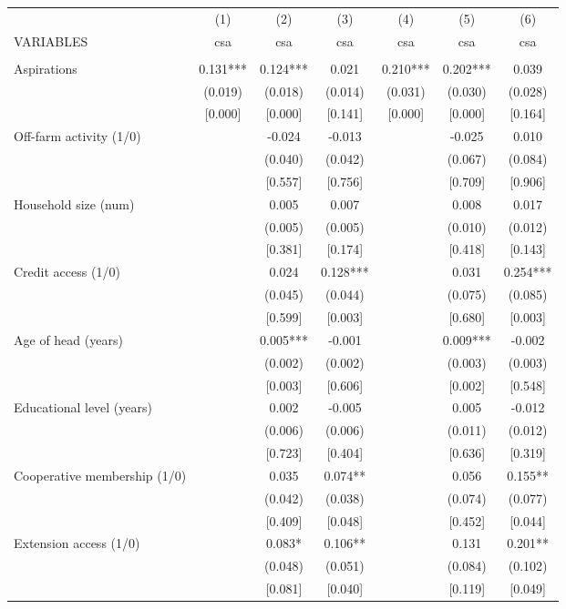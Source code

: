 \documentclass[]{article}
\begin{document}
\begin{tabular}{lcccccc} \hline
 & (1) & (2) & (3) & (4) & (5) & (6) \\
VARIABLES & csa & csa & csa & csa & csa & csa \\ \hline
 &  &  &  &  &  &  \\
Aspirations & 0.131*** & 0.124*** & 0.021 & 0.210*** & 0.202*** & 0.039 \\
 & (0.019) & (0.018) & (0.014) & (0.031) & (0.030) & (0.028) \\
 & [0.000] & [0.000] & [0.141] & [0.000] & [0.000] & [0.164] \\
Off-farm activity (1/0) &  & -0.024 & -0.013 &  & -0.025 & 0.010 \\
 &  & (0.040) & (0.042) &  & (0.067) & (0.084) \\
 &  & [0.557] & [0.756] &  & [0.709] & [0.906] \\
Household size (num) &  & 0.005 & 0.007 &  & 0.008 & 0.017 \\
 &  & (0.005) & (0.005) &  & (0.010) & (0.012) \\
 &  & [0.381] & [0.174] &  & [0.418] & [0.143] \\
Credit access (1/0) &  & 0.024 & 0.128*** &  & 0.031 & 0.254*** \\
 &  & (0.045) & (0.044) &  & (0.075) & (0.085) \\
 &  & [0.599] & [0.003] &  & [0.680] & [0.003] \\
Age of head (years) &  & 0.005*** & -0.001 &  & 0.009*** & -0.002 \\
 &  & (0.002) & (0.002) &  & (0.003) & (0.003) \\
 &  & [0.003] & [0.606] &  & [0.002] & [0.548] \\
Educational level (years) &  & 0.002 & -0.005 &  & 0.005 & -0.012 \\
 &  & (0.006) & (0.006) &  & (0.011) & (0.012) \\
 &  & [0.723] & [0.404] &  & [0.636] & [0.319] \\
Cooperative membership (1/0) &  & 0.035 & 0.074** &  & 0.056 & 0.155** \\
 &  & (0.042) & (0.038) &  & (0.074) & (0.077) \\
 &  & [0.409] & [0.048] &  & [0.452] & [0.044] \\
Extension access (1/0) &  & 0.083* & 0.106** &  & 0.131 & 0.201** \\
 &  & (0.048) & (0.051) &  & (0.084) & (0.102) \\
 &  & [0.081] & [0.040] &  & [0.119] & [0.049] \\

\end{tabular}
\end{document}
